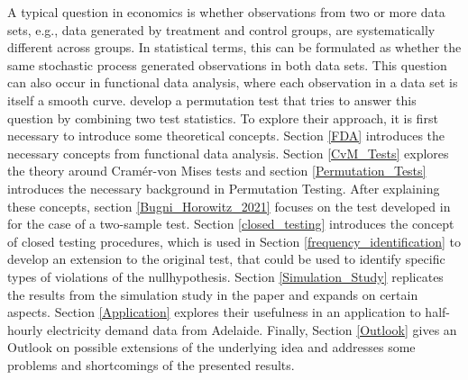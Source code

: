 \documentclass[12pt, a4paper]{article}
\theoremstyle{MAstyle} \newtheorem{assumption}{Assumption}[section]
\theoremstyle{MAstyle} \newtheorem{definition}{Definition}[section]
\begin{document}
		A typical question in economics is whether observations from two or more data sets, e.g., data generated by treatment and control groups, are systematically different across groups. In statistical terms, this can be formulated as whether the same stochastic process generated observations in both data sets.				
		This question can also occur in functional data analysis, where each observation in a data set is itself a smooth curve. \cite{bugni_permutation_2021} develop a permutation test that tries to answer this question by combining two test statistics. To explore their approach, it is first necessary to introduce some theoretical concepts.
		Section \ref{FDA} introduces the necessary concepts from functional data analysis. 
		Section \ref{CvM_Tests} explores the theory around Cram\'{e}r-von Mises tests and section \ref{Permutation_Tests} introduces the necessary background in Permutation Testing.
		After explaining these concepts, section \ref{Bugni_Horowitz_2021} focuses on the test developed in \cite{bugni_permutation_2021} for the case of a two-sample test. Section \ref{closed_testing} introduces the concept of closed testing procedures, which is used in Section \ref{frequency_identification} to develop an extension to the original test, that could be used to identify specific types of violations of the nullhypothesis. Section \ref{Simulation_Study} replicates the results from the simulation study in the paper and expands on certain aspects. Section \ref{Application} explores their usefulness in an application to half-hourly electricity demand data from Adelaide.
		Finally, Section \ref{Outlook} gives an Outlook on possible extensions of the underlying idea and addresses some problems and shortcomings of the presented results.
	
\end{document}
